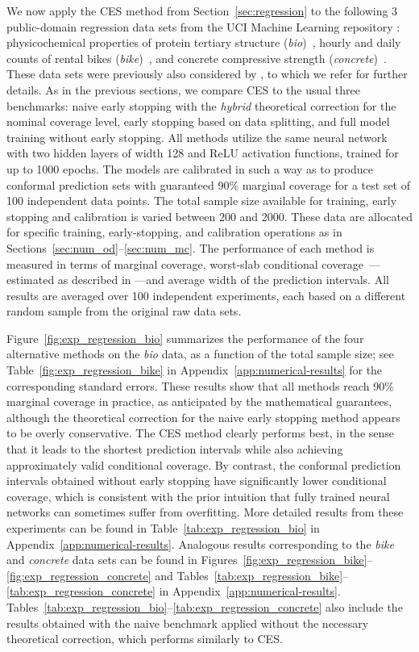 We now apply the CES method from Section~\ref{sec:regression} to the following 3 public-domain regression data sets from the UCI Machine Learning repository \citep{Pinar2012}: physicochemical properties of protein tertiary structure ({\em bio})~\citep{data-bio}, hourly and daily counts of rental bikes ({\em bike})~\citep{data-bike}, and concrete compressive strength ({\em concrete})~\citep{data-concrete}. These data sets were previously also considered by \citet{romano2019conformalized}, to which we refer for further details.
As in the previous sections, we compare CES to the usual three benchmarks: naive early stopping with the {\em hybrid} theoretical correction for the nominal coverage level, early stopping based on data splitting, and full model training without early stopping.
All methods utilize the same neural network with two hidden layers of width 128 and ReLU activation functions, trained for up to 1000 epochs.
The models are calibrated in such a way as to produce conformal prediction sets with guaranteed 90\% marginal coverage for a test set of 100 independent data points.
The total sample size available for training, early stopping and calibration is varied between 200 and 2000.
These data are allocated for specific training, early-stopping, and calibration operations as in Sections~\ref{sec:num_od}--\ref{sec:num_mc}.
The performance of each method is measured in terms of marginal coverage, worst-slab conditional coverage~\citep{cauchois2020knowing}---estimated as described in \citet{sesia2020comparison}---and average width of the prediction intervals. All results are averaged over 100 independent experiments, each based on a different random sample from the original raw data sets.


Figure~\ref{fig:exp_regression_bio} summarizes the performance of the four alternative methods on the {\em bio} data, as a function of the total sample size;  see Table~\ref{fig:exp_regression_bike} in Appendix~\ref{app:numerical-results} for the corresponding standard errors. These results show that all methods reach 90\% marginal coverage in practice, as anticipated by the mathematical guarantees, although the theoretical correction for the naive early stopping method appears to be overly conservative. The CES method clearly performs best, in the sense that it leads to the shortest prediction intervals while also achieving approximately valid conditional coverage. By contrast, the conformal prediction intervals obtained without early stopping have significantly lower conditional coverage, which is consistent with the prior intuition that fully trained neural networks can sometimes suffer from overfitting.
More detailed results from these experiments can be found in Table~\ref{tab:exp_regression_bio} in Appendix~\ref{app:numerical-results}.
Analogous results corresponding to the {\em bike} and {\em concrete} data sets can be found in Figures~\ref{fig:exp_regression_bike}--\ref{fig:exp_regression_concrete} and Tables~\ref{tab:exp_regression_bike}--\ref{tab:exp_regression_concrete} in Appendix~\ref{app:numerical-results}.
Tables~\ref{tab:exp_regression_bio}--\ref{tab:exp_regression_concrete} also include the results obtained with the naive benchmark applied without the necessary theoretical correction, which performs similarly to CES.


